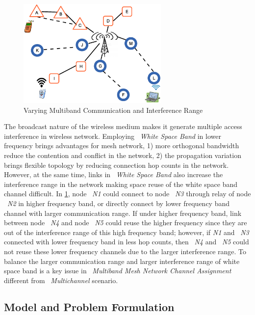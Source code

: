 \begin{figure}                                                                                                                     
\centering
\includegraphics[width=74mm]{figures/interferencerange}
\vspace{-0.1in}
\caption{Varying Multiband Communication and Interference Range}
\label{fig:interferencerange}
\end{figure}


The broadcast nature of the wireless medium makes it generate multiple access interference in wireless network.
Employing ~\emph{White Space Band} in lower frequency brings advantages for mesh network, 1) more orthogonal bandwidth reduce the contention and conflict in the network,
 2) the propagation variation brings flexible topology by reducing connection hop counts in the network.
However, at the same time, links in ~\emph{White Space Band} also increase the interference range in the network making space reuse of the white space band channel difficult. 
In \ref{fig:interferencerange}, node ~\emph{N1} could connect to node ~\emph{N3} through relay of node ~\emph{N2} in higher frequency band, or directly connect by lower frequency band channel with larger communication range.
If under higher frequency band, link between node ~\emph{N4} and node ~\emph{N5} could reuse the higher frequency since they are out of the interference range of this high frequency band; 
however, if \emph{N1} and ~\emph{N3} connected with lower frequency band in less hop counts, then ~\emph{N4} and ~\emph{N5} could not reuse these lower frequency channels due to the larger interference range.
To balance the larger communication range and larger interference range of white space band is a key issue in ~\emph{Multiband Mesh Network Channel Assignment} different from ~\emph{Multichannel} scenario.

\subsection{Model and Problem Formulation}
\label{subsec:problem}


